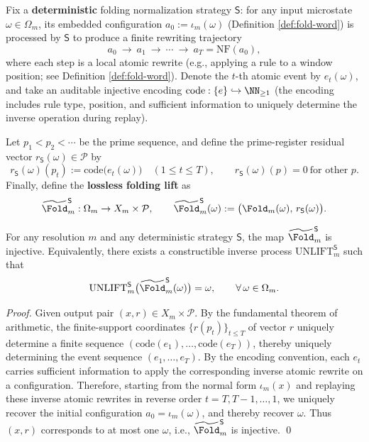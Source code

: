 \begin{definition}\label{def:pom-fold-prime-lift}
Fix a \textbf{deterministic} folding normalization strategy \(\mathsf{S}\): for any input microstate \(\omega\in\Omega_m\), its embedded configuration \(a_0:=\iota_m(\omega)\) (Definition \ref{def:fold-word}) is processed by \(\mathsf{S}\) to produce a finite rewriting trajectory
\[
a_0\ \to\ a_1\ \to\ \cdots\ \to\ a_T=\mathrm{NF}(a_0),
\]
where each step is a local atomic rewrite (e.g., applying a rule to a window position; see Definition \ref{def:fold-word}).
Denote the \(t\)-th atomic event by \(e_t(\omega)\), and take an auditable injective encoding
\(
\mathrm{code}:\{e\}\hookrightarrow\NN_{\ge 1}
\)
(the encoding includes rule type, position, and sufficient information to uniquely determine the inverse operation during replay).
\par
Let \(p_1<p_2<\cdots\) be the prime sequence, and define the prime-register residual vector \(r_{\mathsf S}(\omega)\in\mathcal P\) by
\[
r_{\mathsf S}(\omega)(p_t):=\mathrm{code}\bigl(e_t(\omega)\bigr)\quad(1\le t\le T),
\qquad
r_{\mathsf S}(\omega)(p)=0\ \text{for other }p.
\]
Finally, define the \textbf{lossless folding lift} as
\[
\widetilde{\Fold}^{\mathsf S}_m:\Omega_m\to X_m\times\mathcal P,
\qquad
\widetilde{\Fold}^{\mathsf S}_m(\omega):=\bigl(\Fold_m(\omega),\,r_{\mathsf S}(\omega)\bigr).
\]
\end{definition}

\begin{proposition}\label{prop:pom-fold-prime-lift-injective}
For any resolution \(m\) and any deterministic strategy \(\mathsf S\), the map \(\widetilde{\Fold}^{\mathsf S}_m\) is injective.
Equivalently, there exists a constructible inverse process \(\mathrm{UNLIFT}^{\mathsf S}_m\) such that
\[
\mathrm{UNLIFT}^{\mathsf S}_m\bigl(\widetilde{\Fold}^{\mathsf S}_m(\omega)\bigr)=\omega,\qquad \forall\,\omega\in\Omega_m.
\]
\end{proposition}
\begin{proof}
Given output pair \((x,r)\in X_m\times\mathcal P\).
By the fundamental theorem of arithmetic, the finite-support coordinates \(\{r(p_t)\}_{t\le T}\) of vector \(r\) uniquely determine a finite sequence \((\mathrm{code}(e_1),\dots,\mathrm{code}(e_T))\), thereby uniquely determining the event sequence \((e_1,\dots,e_T)\).
By the encoding convention, each \(e_t\) carries sufficient information to apply the corresponding inverse atomic rewrite on a configuration.
Therefore, starting from the normal form \(\iota_m(x)\) and replaying these inverse atomic rewrites in reverse order \(t=T,T{-}1,\dots,1\), we uniquely recover the initial configuration \(a_0=\iota_m(\omega)\), and thereby recover \(\omega\).
Thus \((x,r)\) corresponds to at most one \(\omega\), i.e., \(\widetilde{\Fold}^{\mathsf S}_m\) is injective. \qed
\end{proof}

